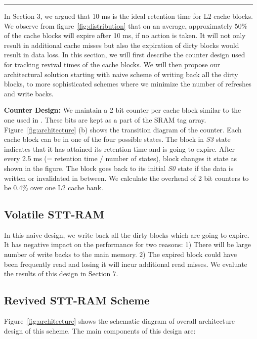 
\begin{figure*} [t]
\center
 \hrule
 \caption{\label{fig:architecture} \scriptsize \bf Schematic of Revived STT-RAM Scheme}
\end{figure*}


In Section 3, we argued that 10 ms is the ideal retention time for L2 cache blocks. We observe from figure~\ref{fig:distribution} that on an average, approximately 50\% of the cache blocks will expire after 10 ms, if no action is taken. It will not only result in additional cache misses but also the expiration of dirty blocks would result in data loss.  In this section, we will first describe the counter design used for tracking revival times of the cache blocks. We will then propose our architectural solution starting with naive scheme of writing back all the dirty blocks,  to more sophisticated schemes where we minimize the number of refreshes and write backs. 

\noindent\textbf{Counter Design:}
We maintain a 2 bit counter per cache block similar to the one used in \cite{marget}. These bits are kept as a part of the SRAM tag array. Figure~\ref{fig:architecture} (b) shows the transition diagram of the counter. Each cache block can be in one of the four possible states.  The block in {\it S3} state indicates that it has attained its retention time and is going to expire. After every 2.5 ms (= retention time / number of states), block changes it state as shown in the figure. The block goes back to its initial {\it S0} state if the data is written or invalidated in between. We calculate the overhead of 2 bit counters to be 0.4\% over one L2 cache bank.

\subsection{{Volatile STT-RAM}}
In this naive design, we write back all the dirty blocks which are going to expire. It has negative impact on the performance for two reasons: 1) There will be large number of write backs to the main memory. 2) The expired block could have been frequently read and losing it will incur additional read misses. We evaluate the results of this design in Section 7.

\subsection{{Revived STT-RAM Scheme}}
Figure~\ref{fig:architecture} shows the schematic diagram of overall architecture design of this scheme. The main components of this design are:

